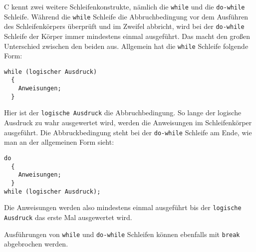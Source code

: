 C kennt zwei weitere Schleifenkonstrukte, nämlich die \verb|while| und die \verb|do-while| Schleife.
Während die \verb|while| Schleife die Abbruchbedingung vor dem Ausführen des Schleifenkörpers überprüft und im Zweifel abbricht, wird bei der \verb|do-while| Schleife der Körper immer mindestens einmal ausgeführt.
Das macht den großen Unterschied zwischen den beiden aus.
Allgemein hat die \verb|while| Schleife folgende Form:
\begin{lstlisting}[caption={while Schleife}, belowcaptionskip=0.3em]
while (logischer Ausdruck)
  {
    Anweisungen;
  }
\end{lstlisting}
Hier ist der \texttt{logische Ausdruck} die Abbruchbedingung.
So lange der logische Ausdruck zu wahr ausgewertet wird, werden die Anweisungen im Schleifenkörper ausgeführt.
Die Abbruckbedingung steht bei der \verb|do-while| Schleife am Ende, wie man an der allgemeinen Form sieht:
\begin{lstlisting}[caption={do-while Schleife}, belowcaptionskip=0.3em]
do
  {
    Anweisungen;
  }
while (logischer Ausdruck);
\end{lstlisting}
Die Anweisungen werden also mindestens einmal ausgeführt bis der \texttt{logische Ausdruck} das erste Mal ausgewertet wird.

Ausführungen von \verb|while| und \verb|do-while| Schleifen können ebenfalls mit \verb|break| abgebrochen werden.
\endinput
